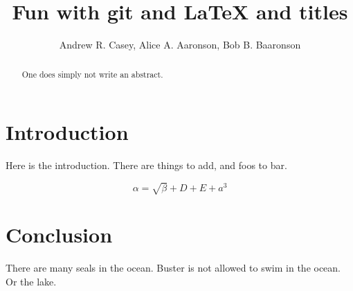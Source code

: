 \documentclass{article}
\begin{document}
\title{Fun with git and \LaTeX{ and titles}}
\author{Andrew R. Casey, Alice A. Aaronson, Bob B. Baaronson}

\maketitle

\begin{abstract}
One does simply not write an abstract.
\end{abstract}

\section{Introduction}
Here is the introduction. There are things to add, and foos to bar.

\begin{equation}
    \label{simple_equation}
    \alpha = \sqrt{ \beta } + D + E + a^3
\end{equation}


\section{Conclusion}
There are many seals in the ocean. Buster is not allowed to swim in the ocean. Or the lake.
\end{document}
